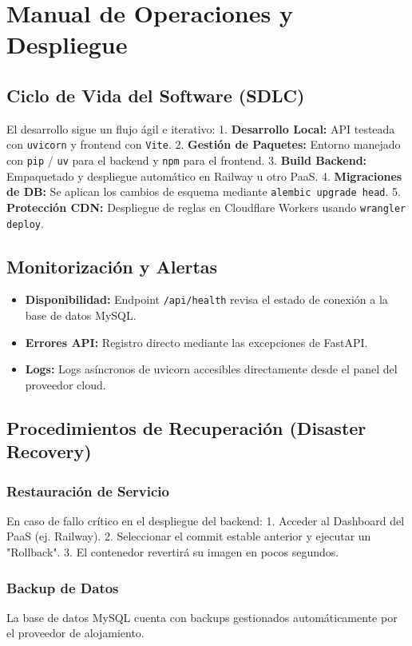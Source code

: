 \section{Manual de Operaciones y Despliegue}

\subsection{Ciclo de Vida del Software (SDLC)}
El desarrollo sigue un flujo ágil e iterativo:
1. \textbf{Desarrollo Local:} API testeada con \texttt{uvicorn} y frontend con \texttt{Vite}.
2. \textbf{Gestión de Paquetes:} Entorno manejado con \texttt{pip} / \texttt{uv} para el backend y \texttt{npm} para el frontend.
3. \textbf{Build Backend:} Empaquetado y despliegue automático en Railway u otro PaaS.
4. \textbf{Migraciones de DB:} Se aplican los cambios de esquema mediante \texttt{alembic upgrade head}.
5. \textbf{Protección CDN:} Despliegue de reglas en Cloudflare Workers usando \texttt{wrangler deploy}.

\subsection{Monitorización y Alertas}
\begin{itemize}
    \item \textbf{Disponibilidad:} Endpoint \texttt{/api/health} revisa el estado de conexión a la base de datos MySQL.
    \item \textbf{Errores API:} Registro directo mediante las excepciones de FastAPI.
    \item \textbf{Logs:} Logs asíncronos de uvicorn accesibles directamente desde el panel del proveedor cloud.
\end{itemize}

\subsection{Procedimientos de Recuperación (Disaster Recovery)}
\subsubsection{Restauración de Servicio}
En caso de fallo crítico en el despliegue del backend:
1. Acceder al Dashboard del PaaS (ej. Railway).
2. Seleccionar el commit estable anterior y ejecutar un "Rollback".
3. El contenedor revertirá su imagen en pocos segundos.

\subsubsection{Backup de Datos}
La base de datos MySQL cuenta con backups gestionados automáticamente por el proveedor de alojamiento.
